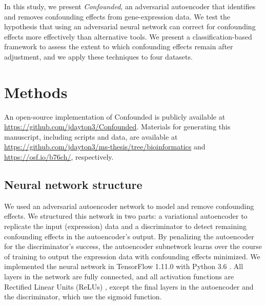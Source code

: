 \documentclass[11pt]{article}
\begin{document}
In this study, we present \textit{Confounded}, an adversarial autoencoder that identifies and removes confounding effects from gene-expression data.
We test the hypothesis that using an adversarial neural network can correct for confounding effects more effectively than alternative tools.
We present a classification-based framework to assess the extent to which confounding effects remain after adjustment, and we apply these techniques to four datasets.

\section{Methods} \label{sec:methods}

An open-source implementation of Confounded is publicly available at \url{https://github.com/jdayton3/Confounded}. Materials for generating this manuscript, including scripts and data, are available at \url{https://github.com/jdayton3/ms-thesis/tree/bioinformatics} and \url{https://osf.io/b76ch/}, respectively.

\subsection{Neural network structure}

We used an adversarial autoencoder network to model and remove confounding effects.
We structured this network in two parts: a variational autoencoder \cite{louizos_variational_2015} to replicate the input (expression) data and a discriminator to detect remaining confounding effects in the autoencoder's output.
By penalizing the autoencoder for the discriminator's success, the autoencoder subnetwork learns over the course of training to output the expression data with confounding effects minimized.
We implemented the neural network in TensorFlow 1.11.0 \cite{abadi_tensorflow_2015} with Python 3.6 \cite{python_software_foundation_python_2019}.
All layers in the network are fully connected, and all activation functions are Rectified Linear Units (ReLUs) \cite{agarap_deep_2018}, except the final layers in the autoencoder and the discriminator, which use the sigmoid function.
\end{document}
